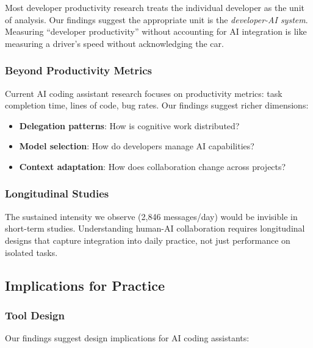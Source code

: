 Most developer productivity research treats the individual developer as the unit of analysis. Our findings suggest the appropriate unit is the \textit{developer-AI system}. Measuring ``developer productivity'' without accounting for AI integration is like measuring a driver's speed without acknowledging the car.

\subsubsection{Beyond Productivity Metrics}

Current AI coding assistant research focuses on productivity metrics: task completion time, lines of code, bug rates. Our findings suggest richer dimensions:
\begin{itemize}
    \item \textbf{Delegation patterns}: How is cognitive work distributed?
    \item \textbf{Model selection}: How do developers manage AI capabilities?
    \item \textbf{Context adaptation}: How does collaboration change across projects?
\end{itemize}

\subsubsection{Longitudinal Studies}

The sustained intensity we observe (2,846 messages/day) would be invisible in short-term studies. Understanding human-AI collaboration requires longitudinal designs that capture integration into daily practice, not just performance on isolated tasks.

\subsection{Implications for Practice}

\subsubsection{Tool Design}

Our findings suggest design implications for AI coding assistants:

